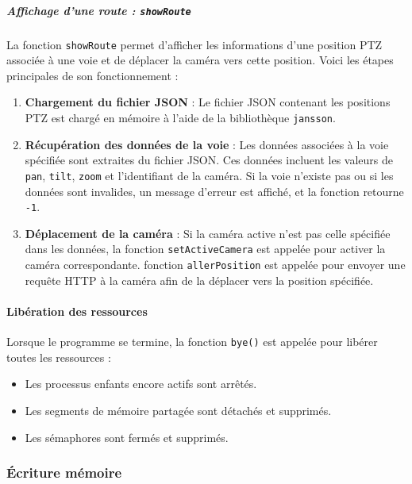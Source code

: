 \documentclass[a4paper, 11pt, french]{article}
\begin{document}
\subparagraph{Affichage d'une route : \texttt{showRoute}}

La fonction \texttt{showRoute} permet d'afficher les informations d'une position PTZ associée à une voie et de déplacer la caméra vers cette position. Voici les étapes principales de son fonctionnement :
\begin{enumerate}
    \item \textbf{Chargement du fichier JSON} :
        Le fichier JSON contenant les positions PTZ est chargé en mémoire à l'aide de la bibliothèque \texttt{jansson}. 
        

    \item \textbf{Récupération des données de la voie} :
        Les données associées à la voie spécifiée sont extraites du fichier JSON.
        Ces données incluent les valeurs de \texttt{pan}, \texttt{tilt}, \texttt{zoom} et l'identifiant de la caméra. Si la voie n'existe pas ou si les données sont invalides, un message d'erreur est affiché, et la fonction retourne \texttt{-1}.
    
    \item \textbf{Déplacement de la caméra} :
        Si la caméra active n'est pas celle spécifiée dans les données, la fonction \texttt{setActiveCamera} est appelée pour activer la caméra correspondante.  fonction \texttt{allerPosition} est appelée pour envoyer une requête HTTP à la caméra afin de la déplacer vers la position spécifiée.
    
\end{enumerate}



\paragraph{Libération des ressources}
Lorsque le programme se termine, la fonction \texttt{bye()} est appelée pour libérer toutes les ressources :
\begin{itemize}
    \item Les processus enfants encore actifs sont arrêtés.
    \item Les segments de mémoire partagée sont détachés et supprimés.
    \item Les sémaphores sont fermés et supprimés.
\end{itemize}


\subsubsection{\'Ecriture mémoire}
\end{document}
